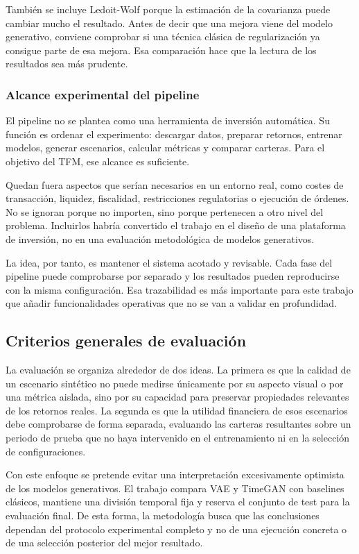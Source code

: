 \documentclass[11pt,a4paper,spanish,oneside]{book}
\numberwithin{equation}{chapter}
\numberwithin{figure}{chapter}
\begin{document}
También se incluye Ledoit-Wolf porque la estimación de la covarianza puede cambiar mucho el resultado. Antes de decir que una mejora viene del modelo generativo, conviene comprobar si una técnica clásica de regularización ya consigue parte de esa mejora. Esa comparación hace que la lectura de los resultados sea más prudente.

\subsubsection{Alcance experimental del pipeline}

El pipeline no se plantea como una herramienta de inversión automática. Su función es ordenar el experimento: descargar datos, preparar retornos, entrenar modelos, generar escenarios, calcular métricas y comparar carteras. Para el objetivo del TFM, ese alcance es suficiente.

Quedan fuera aspectos que serían necesarios en un entorno real, como costes de transacción, liquidez, fiscalidad, restricciones regulatorias o ejecución de órdenes. No se ignoran porque no importen, sino porque pertenecen a otro nivel del problema. Incluirlos habría convertido el trabajo en el diseño de una plataforma de inversión, no en una evaluación metodológica de modelos generativos.

La idea, por tanto, es mantener el sistema acotado y revisable. Cada fase del pipeline puede comprobarse por separado y los resultados pueden reproducirse con la misma configuración. Esa trazabilidad es más importante para este trabajo que añadir funcionalidades operativas que no se van a validar en profundidad.

\subsection{Criterios generales de evaluación}

La evaluación se organiza alrededor de dos ideas. La primera es que la calidad de un escenario sintético no puede medirse únicamente por su aspecto visual o por una métrica aislada, sino por su capacidad para preservar propiedades relevantes de los retornos reales. La segunda es que la utilidad financiera de esos escenarios debe comprobarse de forma separada, evaluando las carteras resultantes sobre un periodo de prueba que no haya intervenido en el entrenamiento ni en la selección de configuraciones.

Con este enfoque se pretende evitar una interpretación excesivamente optimista de los modelos generativos. El trabajo compara VAE y TimeGAN con baselines clásicos, mantiene una división temporal fija y reserva el conjunto de test para la evaluación final. De esta forma, la metodología busca que las conclusiones dependan del protocolo experimental completo y no de una ejecución concreta o de una selección posterior del mejor resultado.
\end{document}
